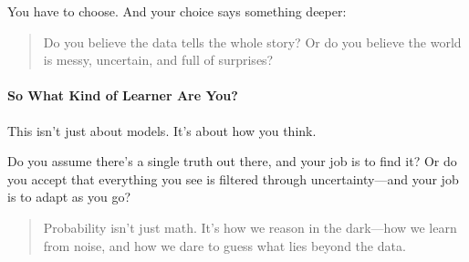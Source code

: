 You have to choose. And your choice says something deeper:

\begin{quote}
Do you believe the data tells the whole story?  
Or do you believe the world is messy, uncertain, and full of surprises?
\end{quote}

\paragraph{So What Kind of Learner Are You?}

This isn’t just about models. It’s about how you think.

Do you assume there’s a single truth out there, and your job is to find it?  
Or do you accept that everything you see is filtered through uncertainty—and your job is to adapt as you go?

\begin{quote}
Probability isn’t just math.  
It’s how we reason in the dark—how we learn from noise, and how we dare to guess what lies beyond the data.
\end{quote}
